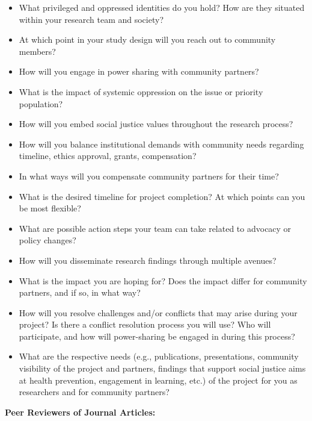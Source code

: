 \documentclass[
  11pt,
]{book}
\providecommand{\tightlist}{%
  \setlength{\itemsep}{0pt}\setlength{\parskip}{0pt}}
\begin{document}
\begin{itemize}
\tightlist
\item
  What privileged and oppressed identities do you hold? How are they situated within your research team and society?
\item
  At which point in your study design will you reach out to community members?
\item
  How will you engage in power sharing with community partners?
\item
  What is the impact of systemic oppression on the issue or priority population?
\item
  How will you embed social justice values throughout the research process?
\item
  How will you balance institutional demands with community needs regarding timeline, ethics approval, grants, compensation?
\item
  In what ways will you compensate community partners for their time?
\item
  What is the desired timeline for project completion? At which points can you be most flexible?
\item
  What are possible action steps your team can take related to advocacy or policy changes?
\item
  How will you disseminate research findings through multiple avenues?
\item
  What is the impact you are hoping for? Does the impact differ for community partners, and if so, in what way?
\item
  How will you resolve challenges and/or conflicts that may arise during your project? Is there a conflict resolution process you will use? Who will participate, and how will power-sharing be engaged in during this process?
\item
  What are the respective needs (e.g., publications, presentations, community visibility of the project and partners, findings that support social justice aims at health prevention, engagement in learning, etc.) of the project for you as researchers and for community partners?
\end{itemize}

\textbf{Peer Reviewers of Journal Articles:}
\end{document}
